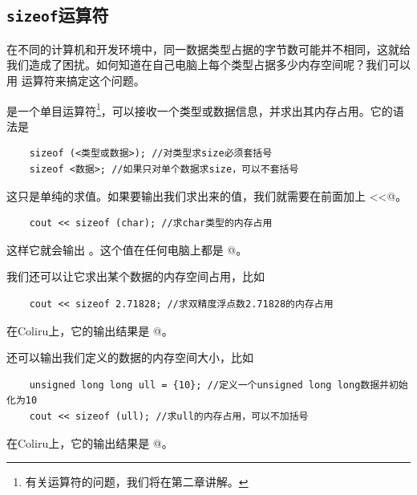 \subsection*{\texttt{sizeof}运算符}
在不同的计算机和开发环境中，同一数据类型占据的字节数可能并不相同，这就给我们造成了困扰。如何知道在自己电脑上每个类型占据多少内存空间呢？我们可以用 \lstinline@sizeof@ 运算符来搞定这个问题。\par
\lstinline@sizeof@ 是一个单目运算符\footnote{有关运算符的问题，我们将在第二章讲解。}，可以接收一个类型或数据信息，并求出其内存占用。它的语法是
\begin{lstlisting}
    sizeof (<类型或数据>); //对类型求size必须套括号
    sizeof <数据>; //如果只对单个数据求size，可以不套括号
\end{lstlisting}
这只是单纯的求值。如果要输出我们求出来的值，我们就需要在前面加上 \lstinline@cout<<@。
\begin{lstlisting}
    cout << sizeof (char); //求char类型的内存占用
\end{lstlisting}
这样它就会输出 。这个值在任何电脑上都是 @。\par
我们还可以让它求出某个数据的内存空间占用，比如
\begin{lstlisting}
    cout << sizeof 2.71828; //求双精度浮点数2.71828的内存占用
\end{lstlisting}
在Coliru上，它的输出结果是 @。\par
还可以输出我们定义的数据的内存空间大小，比如
\begin{lstlisting}
    unsigned long long ull = {10}; //定义一个unsigned long long数据并初始化为10
    cout << sizeof (ull); //求ull的内存占用，可以不加括号
\end{lstlisting}
在Coliru上，它的输出结果是 @。\par
